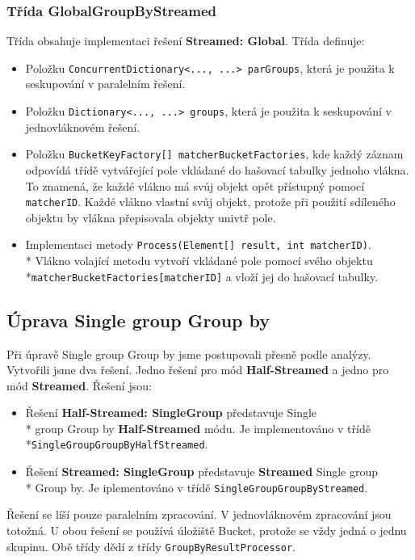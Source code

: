 \subsubsection{Třída GlobalGroupByStreamed}

Třída obsahuje implementaci řešení \textbf{Streamed: Global}.
Třída definuje:
\begin{itemize}
\item Položku \texttt{ConcurrentDictionary<..., ...> parGroups}, která je použita k seskupování v paralelním řešení.
\item Položku \texttt{Dictionary<..., ...> groups}, která je použita k seskupování v jednovláknovém řešení.
\item Položku \texttt{BucketKeyFactory[] matcherBucketFactories}, kde každý záznam odpovídá třídě vytvářející pole vkládané do hašovací tabulky jednoho vlákna.
To znamená, že každé vlákno má svůj objekt opět přístupný pomocí \texttt{matcherID}.
Každé vlákno vlastní svůj objekt, protože při použití sdíleného objektu by vlákna přepisovala objekty univtř pole.
\item Implementaci metody \texttt{Process(Element[] result, int matcherID)}.\\*
Vlákno volající metodu vytvoří vkládané pole pomocí svého objektu \\*\texttt{matcherBucketFactories[matcherID]} a vloží jej do hašovací tabulky.
\end{itemize}

\subsection{Úprava Single group Group by}

Při úpravě Single group Group by jsme postupovali přesně podle analýzy.
Vytvořili jsme dva řešení.
Jedno řešení pro mód \textbf{Half-Streamed} a jedno pro mód \textbf{Streamed}.
Řešení jsou:
\begin{itemize}
\item Řešení \textbf{Half-Streamed: SingleGroup} představuje Single\\* group Group by \textbf{Half-Streamed} módu.
Je implementováno v třídě \\*\texttt{SingleGroupGroupByHalfStreamed}.
\item Řešení \textbf{Streamed: SingleGroup} představuje \textbf{Streamed} Single group\\* Group by.
Je iplementováno v třídě \texttt{SingleGroupGroupByStreamed}.
\end{itemize}
Řešení se líší pouze paralelním zpracování. 
V jednovláknovém zpracování jsou totožná.
U obou řešení se používá úložiště Bucket, protože se vždy jedná o jednu skupinu.
Obě třídy dědí z třídy \texttt{GroupByResultProcessor}.

